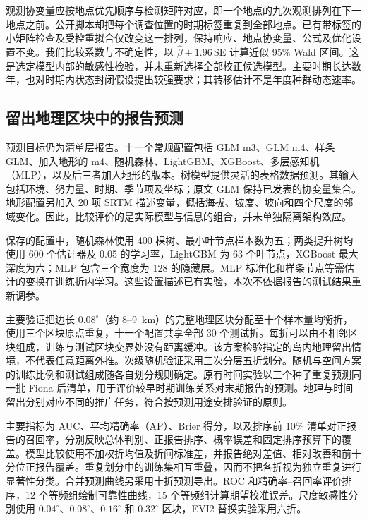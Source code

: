 观测协变量应按地点优先顺序与检测矩阵对应，即一个地点的九次观测排列在下一地点之前。公开脚本却把每个调查位置的时期标签重复到全部地点。已有带标签的小矩阵检查及受控重拟合仅改变这一排列，保持响应、地点协变量、公式及优化设置不变。我们比较系数与不确定性，以 $\widehat\beta\pm1.96\,\mathrm{SE}$ 计算近似 95\% Wald 区间。这是选定模型内部的敏感性检验，并未重新选择全部校正候选模型。主要时期长达数年，也对时期内状态封闭假设提出较强要求；其转移估计不是年度种群动态速率。

\subsection{留出地理区块中的报告预测}
\label{sec:protocols}
预测目标仍为清单层报告。十一个常规配置包括 GLM m3、GLM m4、样条 GLM、加入地形的 m4、随机森林、LightGBM、XGBoost、多层感知机（MLP），以及后三者加入地形的版本。树模型提供灵活的表格数据预测\cite{breiman2001,ke2017,chen2016}。其输入包括环境、努力量、时期、季节项及坐标；原文 GLM 保持已发表的协变量集合。地形配置另加入 20 项 SRTM 描述变量，概括海拔、坡度、坡向和四个尺度的邻域变化。因此，比较评价的是实际模型与信息的组合，并未单独隔离架构效应。

保存的配置中，随机森林使用 400 棵树、最小叶节点样本数为五；两类提升树均使用 600 个估计器及 0.05 的学习率，LightGBM 为 63 个叶节点，XGBoost 最大深度为六；MLP 包含三个宽度为 128 的隐藏层。MLP 标准化和样条节点等需估计的变换在训练折内学习。这些设置描述已有实验，本次不依据报告的测试结果重新调参。

主要验证把边长 $0.08^\circ$（约 8--9~km）的完整地理区块分配至十个样本量均衡折，使用三个区块原点重复，十一个配置共享全部 30 个测试折。每折可以由不相邻区块组成，训练与测试区块交界处没有距离缓冲。该方案检验指定的岛内地理留出情境，不代表任意距离外推。次级随机验证采用三次分层五折划分。随机与空间方案的训练比例和测试组成随各自划分规则确定。原有时间实验以三个种子重复预测同一批 Fiona 后清单，用于评价较早时期训练关系对末期报告的预测。地理与时间留出分别对应不同的推广任务，符合按预测用途安排验证的原则\cite{spacetime2025}。

主要指标为 AUC、平均精确率（AP）、Brier 得分，以及排序前 10\% 清单对正报告的召回率\cite{saito2015,brier1950}，分别反映总体判别、正报告排序、概率误差和固定排序预算下的覆盖。模型比较使用不加权折均值及折间标准差，并报告绝对差值、相对改善和前十分位正报告覆盖。重复划分中的训练集相互重叠，因而不把各折视为独立重复进行显著性分类。合并预测曲线另采用十折预测导出。ROC 和精确率--召回率评价排序，12 个等频组绘制可靠性曲线，15 个等频组计算期望校准误差。尺度敏感性分别使用 $0.04^\circ$、$0.08^\circ$、$0.16^\circ$ 和 $0.32^\circ$ 区块，EVI2 替换实验采用六折。

